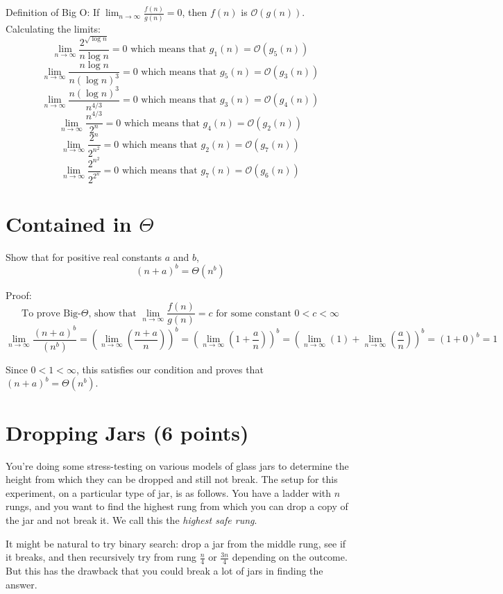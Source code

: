 \documentclass[11pt]{article}
\begin{document}
    Definition of Big O: If $\lim_{n\to\infty} \frac{f(n)}{g(n)} = 0$, then $f(n)$ is $\mathcal{O}(g(n))$. Calculating the limits:
    \[\lim_{n\to\infty} \frac{2^{\sqrt{\log n}}}{n \log n} = 0 \text{ which means that } g_1(n) = \mathcal{O}(g_5(n))\]
    \[\lim_{n\to\infty} \frac{n \log n}{n {(\log n)}^3} = 0 \text{ which means that } g_5(n) = \mathcal{O}(g_3(n))\]
    \[\lim_{n\to\infty} \frac{n {(\log n)}^3}{n^{4/3}} = 0 \text{ which means that } g_3(n) = \mathcal{O}(g_4(n))\]
    \[\lim_{n\to\infty} \frac{n^{4/3}}{2^n} = 0 \text{ which means that } g_4(n) = \mathcal{O}(g_2(n))\]
    \[\lim_{n\to\infty} \frac{2^n}{2^{n^2}} = 0 \text{ which means that } g_2(n) = \mathcal{O}(g_7(n))\]
    \[\lim_{n\to\infty} \frac{2^{n^2}}{2^{2^n}} = 0 \text{ which means that } g_7(n) = \mathcal{O}(g_6(n))\]

\section{Contained in \texorpdfstring{$\Theta$} }

Show that for positive real constants $a$ and $b$,
\[ {(n + a)}^b = \Theta(n^b) \]

Proof: \[ \text{To prove Big-} \Theta \text{, show that }\lim_{n\to\infty} \frac{f(n)}{g(n)} = c \text{ for some constant } 0 < c < \infty\]
\[ \lim_{n\to\infty} \frac{{(n + a)}^b}{(n^b)} = {(\lim_{n\to\infty} {(\frac{n + a}{n})})}^b = {(\lim_{n\to\infty} {(1+\frac{a}{n})})}^b = {(\lim_{n\to\infty}{(1)}+\lim_{n\to\infty}{(\frac{a}{n})})}^b = {(1 + 0)}^b = {1}\]

Since $0 < 1 < {\infty}$, this satisfies our condition and proves that ${(n + a)}^b = \Theta(n^b)$.

\section{Dropping Jars (6 points)}

You're doing some stress-testing on various models of glass jars to determine the height from which they can be dropped and still not break. The setup for this experiment, on a particular type of jar, is as follows. You have a ladder with $n$ rungs, and you want to find the highest rung from which you can drop a copy of the jar and not break it. We call this the \textit{highest safe rung}.

It might be natural to try binary search: drop a jar from the middle rung, see if it breaks, and then recursively try from rung $\frac{n}{4}$ or $\frac{3n}{4}$ depending on the outcome. But this has the drawback that you could break a lot of jars in finding the answer.
\end{document}
